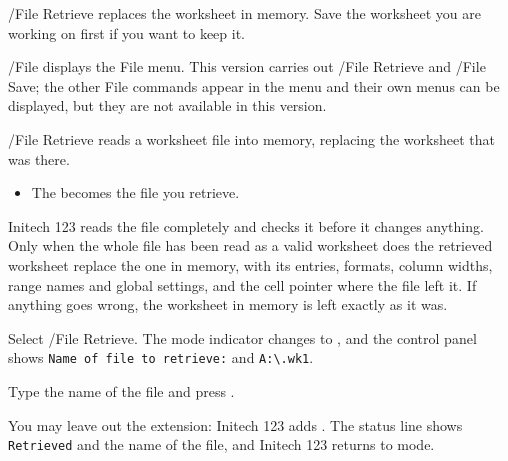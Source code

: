 \begin{Caution}
/File Retrieve replaces the worksheet in memory.  Save the worksheet you
are working on first if you want to keep it.
\end{Caution}

/File displays the File menu.  This version carries out /File Retrieve and
/File Save; the other File commands appear in the menu and their own menus
can be displayed, but they are not available in this version.

/File Retrieve reads a worksheet file into memory, replacing the worksheet
that was there.

\begin{itemize}
\item The  becomes the file you retrieve.
\end{itemize}
Initech 123 reads the file completely and checks it before it changes
anything.  Only when the whole file has been read as a valid 
worksheet does the retrieved worksheet replace the one in memory, with its
entries, formats, column widths, range names and global settings, and the
cell pointer where the file left it.  If anything goes wrong, the worksheet
in memory is left exactly as it was.

\begin{Steps123}
\item Select /File Retrieve.  The mode indicator changes to ,
  and the control panel shows \texttt{Name of file to retrieve:} and
  \texttt{A:\textbackslash *.wk1}.
\item Type the name of the file and press .

  You may leave out the extension: Initech 123 adds .  The
  status line shows \texttt{Retrieved} and the name of the file, and
  Initech 123 returns to  mode.
\end{Steps123}

